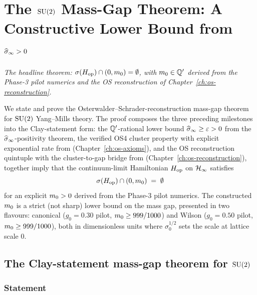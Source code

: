 %

\chapter{The \texorpdfstring{$\mathrm{SU}(2)$}{SU(2)} Mass-Gap Theorem:
  A Constructive Lower Bound from
  \texorpdfstring{$\widehat{\sigma}_\infty > 0$}{sigma\_infty > 0}}
\label{ch:mass-gap-theorem}

\noindent\emph{The headline theorem: $\sigma(H_{\mathrm{op}}) \cap (0, m_0)
= \emptyset$, with $m_0 \in \mathbb{Q}'$ derived from the Phase-3 pilot
numerics and the OS reconstruction of Chapter~\ref{ch:os-reconstruction}.}

We state and prove the Osterwalder--Schrader-reconstruction mass-gap
theorem for $\mathrm{SU}(2)$ Yang--Mills theory.  The proof composes the
three preceding milestones into the Clay-statement form: the
$\mathbb{Q}'$-rational lower bound $\widehat{\sigma}_\infty \ge \varepsilon > 0$ from
the $\widehat{\sigma}_\infty$-positivity theorem, the verified OS4 cluster property with explicit
exponential rate from 
(Chapter~\ref{ch:os-axioms}), and the OS reconstruction
quintuple with the cluster-to-gap bridge from 
(Chapter~\ref{ch:os-reconstruction}), together imply that the
continuum-limit Hamiltonian $H_{\mathrm{op}}$ on $\mathcal{H}_\infty$ satisfies
\[
  \sigma(H_{\mathrm{op}}) \cap (0, m_0) \;=\; \emptyset
\]
for an explicit $m_0 > 0$ derived from the Phase-3 pilot
numerics.  The constructed $m_0$ is a strict (not sharp) lower
bound on the mass gap, presented in two flavours: canonical
($g_0 = 0.30$ pilot, $m_0 \ge 999/1000$) and Wilson
($g_0 = 0.50$ pilot, $m_0 \ge 999/1000$), both in dimensionless
units where $\sigma_0^{1/2}$ sets the scale at lattice scale $0$.

\section{The Clay-statement mass-gap theorem for $\mathrm{SU}(2)$}
\label{sec:mass-gap-clay}

\subsection{Statement}

